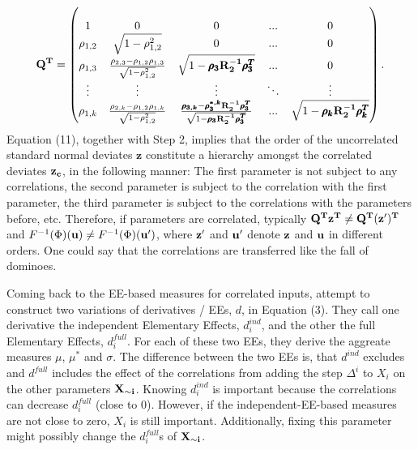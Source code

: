 \documentclass[a4paper,12pt]{article}
\begin{document}
\begin{align}
\bold{Q^T} =
\begin{pmatrix}
\\ 1 & 0 & 0 & ... & 0
\\\rho_{1,2} & \sqrt{1-\rho_{1,2}^2} & 0 & ... & 0
\\ \rho_{1,3} & \frac{\rho_{2,3}-\rho_{1,2}\rho_{1,3}}{\sqrt{1-\rho_{1,2}^2}} & \sqrt{1-\pmb{\rho_{3}}\bold{R^{-1}_2}\pmb{\rho_{3}^T}} & ... & 0
\\\vdots & \vdots & \vdots & 	\ddots & \vdots
\\ \rho_{1,k} &\frac{\rho_{2,k}-\rho_{1,2}\rho_{1,k}}{\sqrt{1-\rho_{1,2}^2}} & \frac{\pmb{\rho_{3,k}}-\pmb{\rho_{3}^{*,k}}\bold{R^{-1}_2}\pmb{\rho_{3}^T}}{\sqrt{1-\pmb{\rho_{3}}\bold{R^{-1}_2}\pmb{\rho_{3}^T}}}  &
... & \sqrt{1-\pmb{\rho_{k}}\bold{R^{-1}_2}\pmb{\rho_{k}^T}}
\end{pmatrix}.
\end{align}
Equation (11), together with Step 2, implies that the order of the uncorrelated standard normal deviates $\pmb{z}$ constitute a hierarchy amongst the correlated deviates $\bold{z_c}$, in the following manner: The first parameter is not subject to any correlations, the second parameter is subject to the correlation with the first parameter, the third parameter is subject to the correlations with the parameters before, etc. Therefore, if parameters are correlated, typically $\bold{Q^T z^T} \neq \bold{Q^T (z')^T}$ and $F^{-1}(\Phi)(\bold{u}) \neq F^{-1}(\Phi)(\bold{u'})$, where $\bold{z'}$ and $\bold{u'}$ denote $\bold{z}$ and $\bold{u}$ in different orders. One could say that the correlations are transferred like the fall of dominoes.

Coming back to the EE-based measures for correlated inputs, \cite{ge2017extending} attempt to construct two variations of derivatives / EEs, $d$, in Equation (3). They call one derivative the independent Elementary Effects, $d_i^{ind}$, and the other the full Elementary Effects, $d_i^{full}$. For each of these two EEs, they derive the aggreate measures $\mu$, $\mu^*$ and $\sigma$. The difference between the two EEs is, that $d^{ind}$ excludes and $d^{full}$ includes the effect of the correlations from adding the step $\Delta^i$ to $X_i$ on the other parameters $\bold{X_{\sim i}}$. Knowing $d_i^{ind}$ is important because the correlations can decrease $d_i^{full}$ (close to 0). However, if the independent-EE-based measures are not close to zero, $X_i$ is still important. Additionally, fixing this parameter might possibly change the $d_i^{full}$s of $\bold{X_{\sim i}}$.\\
\end{document}
